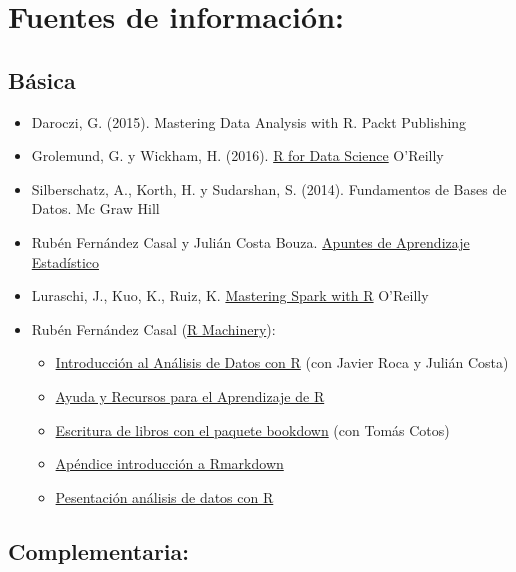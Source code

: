 \documentclass[
]{book}
\begin{document}
\section{Fuentes de información:}\label{fuentes-de-informaciuxf3n}

\subsection{Básica}\label{buxe1sica}

\begin{itemize}
\item
  Daroczi, G. (2015). Mastering Data Analysis with R. Packt Publishing
\item
  Grolemund, G. y Wickham, H. (2016). \href{https://r4ds.had.co.nz/}{R for Data Science} O'Reilly
\item
  Silberschatz, A., Korth, H. y Sudarshan, S. (2014). Fundamentos de Bases de Datos. Mc Graw Hill
\item
  Rubén Fernández Casal y Julián Costa Bouza. \href{https://rubenfcasal.github.io/aprendizaje_estadistico/}{Apuntes de Aprendizaje Estadístico}
\item
  Luraschi, J., Kuo, K., Ruiz, K. \href{https://therinspark.com/}{Mastering Spark with R} O'Reilly
\item
  Rubén Fernández Casal (\href{https://rubenfcasal.github.io}{R Machinery}):

  \begin{itemize}
  \item
    \href{https://rubenfcasal.github.io/intror}{Introducción al Análisis de Datos con R}
    (con Javier Roca y Julián Costa)
  \item
    \href{https://rubenfcasal.github.io/post/ayuda-y-recursos-para-el-aprendizaje-de-r}{Ayuda y Recursos para el Aprendizaje de R}
  \item
    \href{https://rubenfcasal.github.io/bookdown_intro}{Escritura de libros con el paquete bookdown}
    (con Tomás Cotos)
  \item
    \href{https://rubenfcasal.github.io/bookdown_intro/rmarkdown.html}{Apéndice introducción a Rmarkdown}
  \item
    \href{https://rubenfcasal.github.io/post/presentaciones/AnalisisDatosR.pdf}{Pesentación análisis de datos con R}
  \end{itemize}
\end{itemize}

\subsection{Complementaria:}\label{complementaria}
\end{document}
